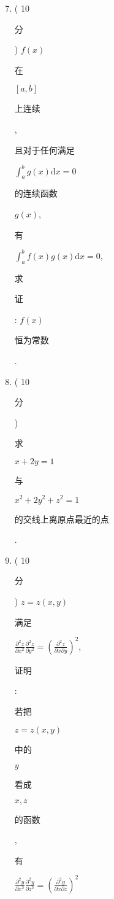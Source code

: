 \documentclass[10pt]{article}
\begin{document}
\begin{enumerate}
  \setcounter{enumi}{6}
  \item ( 10 \begin{CJK}{UTF8}{mj}分\end{CJK}) $f(x)$ \begin{CJK}{UTF8}{mj}在\end{CJK} $[a, b]$ \begin{CJK}{UTF8}{mj}上连续\end{CJK}, \begin{CJK}{UTF8}{mj}且对于任何满足\end{CJK} $\int_{a}^{b} g(x) \mathrm{d} x=0$ \begin{CJK}{UTF8}{mj}的连续函数\end{CJK} $g(x)$, \begin{CJK}{UTF8}{mj}有\end{CJK} $\int_{a}^{b} f(x) g(x) \mathrm{d} x=0$, \begin{CJK}{UTF8}{mj}求\end{CJK} \begin{CJK}{UTF8}{mj}证\end{CJK}: $f(x)$ \begin{CJK}{UTF8}{mj}恒为常数\end{CJK}.

  \item ( 10 \begin{CJK}{UTF8}{mj}分\end{CJK}) \begin{CJK}{UTF8}{mj}求\end{CJK} $x+2 y=1$ \begin{CJK}{UTF8}{mj}与\end{CJK} $x^{2}+2 y^{2}+z^{2}=1$ \begin{CJK}{UTF8}{mj}的交线上离原点最近的点\end{CJK}.

  \item ( 10 \begin{CJK}{UTF8}{mj}分\end{CJK}) $z=z(x, y)$ \begin{CJK}{UTF8}{mj}满足\end{CJK} $\frac{\partial^{2} z}{\partial x^{2}} \frac{\partial^{2} z}{\partial y^{2}}=\left(\frac{\partial^{2} z}{\partial x \partial y}\right)^{2}$, \begin{CJK}{UTF8}{mj}证明\end{CJK}: \begin{CJK}{UTF8}{mj}若把\end{CJK} $z=z(x, y)$ \begin{CJK}{UTF8}{mj}中的\end{CJK} $y$ \begin{CJK}{UTF8}{mj}看成\end{CJK} $x, z$ \begin{CJK}{UTF8}{mj}的函数\end{CJK}, \begin{CJK}{UTF8}{mj}有\end{CJK} $\frac{\partial^{2} y}{\partial x^{2}} \frac{\partial^{2} y}{\partial z^{2}}=\left(\frac{\partial^{2} y}{\partial x \partial z}\right)^{2}$


\end{enumerate}
\end{document}
